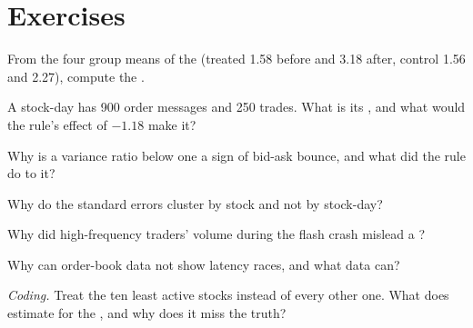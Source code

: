 \section{Exercises}

\begin{exercise}[$\star$]\label{exo:mx:market-quality-and-regulation:1}
From the four group means of the  (treated 1.58 before and 3.18 after, control 1.56 and 2.27), compute the .
\end{exercise}

\begin{exercise}[$\star$]\label{exo:mx:market-quality-and-regulation:2}
A stock-day has 900 order messages and 250 trades. What is its , and what would the rule's effect of $-1.18$ make it?
\end{exercise}

\begin{exercise}[$\star$]\label{exo:mx:market-quality-and-regulation:3}
Why is a variance ratio below one a sign of bid-ask bounce, and what did the rule do to it?
\end{exercise}

\begin{exercise}[$\star\star$]\label{exo:mx:market-quality-and-regulation:4}
Why do the standard errors cluster by stock and not by stock-day?
\end{exercise}

\begin{exercise}[$\star\star$]\label{exo:mx:market-quality-and-regulation:5}
Why did high-frequency traders' volume during the flash crash mislead a ?
\end{exercise}

\begin{exercise}[$\star\star$]\label{exo:mx:market-quality-and-regulation:6}
Why can order-book data not show latency races, and what data can?
\end{exercise}

\begin{exercise}[$\star\star\star$]\label{exo:mx:market-quality-and-regulation:7}
\emph{Coding.} Treat the ten least active stocks instead of every other one. What does  estimate for the , and
why does it miss the truth?
\end{exercise}

